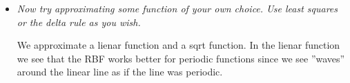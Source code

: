 \documentclass[a4paper,11pt]{article}
\begin{document}
\begin{itemize}
\item \textit{Now try approximating some function of your own choice. Use least squares or the delta rule as you wish.}

We approximate a lienar function and a sqrt function. In the lienar function we see that the RBF works better for periodic functions since we see ''waves'' around the linear line as if the line was periodic.

\begin{figure}[h!]

\label{fig3}
\caption{}
\end{figure}
\end{itemize}
\end{document}
